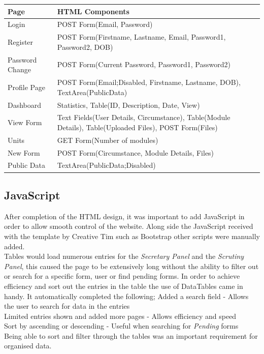 \documentclass[../main.tex]{subfiles}
\begin{document}
\bgroup
\def\arraystretch{2}%
\begin{table}[H]
\centering
\begin{tabular}{|l| p{9cm} |}
\hline
\textbf{Page} & \textbf{HTML Components} \\ \hline
Login & POST Form(Email, Password) \\ \hline
Register & POST Form(Firstname, Lastname, Email, Password1, Password2, DOB) \\ \hline
Password Change & POST Form(Current Password, Password1, Password2) \\ \hline
Profile Page & POST Form(Email;Disabled, Firstname, Lastname, DOB), TextArea(PublicData) \\ \hline
Dashboard & Statistics, Table(ID, Description, Date, View) \\ \hline
View Form & Text Fields(User Details, Circumstance), Table(Module Details), Table(Uploaded Files), POST Form(Files) \\ \hline
Units & GET Form(Number of modules) \\ \hline
New Form & POST Form(Circumstance, Module Details, Files) \\ \hline
Public Data & TextArea(PublicData;Disabled) \\ \hline
\end{tabular}%
\label{tab:htmlcom} 
\end{table}
\egroup

\subsection{JavaScript}
After completion of the HTML design, it was important to add JavaScript in order to allow smooth control of the website. Along side the JavaScript received with the template by Creative Tim\cite{creativeTimTemplate} such as Bootstrap\cite{bootstrapfour} other scripts were manually added.  \\[4mm]

Tables would load numerous entries for the \textit{Secretary Panel} and the \textit{Scrutiny Panel}, this caused the page to be extensively long without the ability to filter out or search for a specific form, user or find pending forms. In order to achieve efficiency and sort out the entries in the table the use of DataTables\cite{datatables} came in handy. It automatically completed the following;
Added a search field - Allows the user to search for data in the entries\\
Limited entries shown and added more pages - Allows efficiency and speed\\
Sort by ascending or descending - Useful when searching for \textit{Pending} forms \\
Being able to sort and filter through the tables was an important requirement for organised data. \\[4mm]
\end{document}

